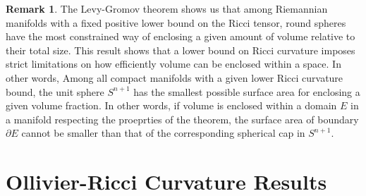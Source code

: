 \documentclass{Dissertate}
\theoremstyle{definition}
\theoremstyle{definition} %
\theoremstyle{definition}
\newtheorem{remark}[theorem]{Remark}
\begin{document}
\begin{remark}
The Levy-Gromov theorem shows us that among Riemannian manifolds with a fixed positive lower bound on the Ricci tensor, round spheres have the most constrained way of enclosing a given amount of volume relative to their total size. This result shows that a lower bound on Ricci curvature imposes strict limitations on how efficiently volume can be enclosed within a space. In other words, Among all compact manifolds with a given lower Ricci curvature bound, the unit sphere $S^{n+1}$ has the smallest possible surface area for enclosing a given volume fraction. In other words, 
if volume is enclosed within a domain 
$E$ in a manifold respecting the proeprties of the theorem, the surface area of boundary $\partial E$ cannot be smaller than that of the corresponding spherical cap in $S^{n+1}$. 
\end{remark}

\section*{Ollivier-Ricci Curvature Results}
\end{document}
